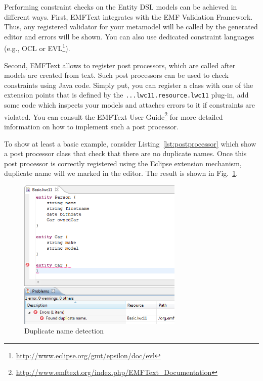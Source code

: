 \documentclass[10pt, pdftex]{llncs}
\begin{document}
Performing constraint checks on the Entity DSL models can be achieved in
different ways. First, EMFText integrates with the EMF Validation Framework.
Thus, any registered validator for your metamodel will be called by the
generated editor and errors will be shown. You can also use dedicated constraint
languages (e.g., OCL or EVL\footnote{\url{http://www.eclipse.org/gmt/epsilon/doc/evl}}).

Second, EMFText allows to register post processors, which are called after
models are created from text. Such post processors can be used to check constraints
using Java code. Simply put, you can register a class with one of the
extension points that is defined by the \texttt{...lwc11.resource.lwc11}
plug-in, add some code which inspects your models and attaches errors to it if
constraints are violated. You can consult the EMFText User
Guide\footnote{\url{http://www.emftext.org/index.php/EMFText\_Documentation}} 
for more detailed information on how to implement such a post processor.



To show at least a basic example, consider Listing~\ref{lst:postprocessor} which
show a post processor class that check that there are no duplicate names. Once
this post processor is correctly registered using the Eclipse extension
mechanism, duplicate name will we marked in the editor. The result is shown in
Fig.~\ref{fig:duplicatenames}.

\begin{figure}
	\centering
	\includegraphics[width=0.70\textwidth]{figures/duplicatename.png}
	\caption{Duplicate name detection}
	\label{fig:duplicatenames}
\end{figure}
\end{document}
